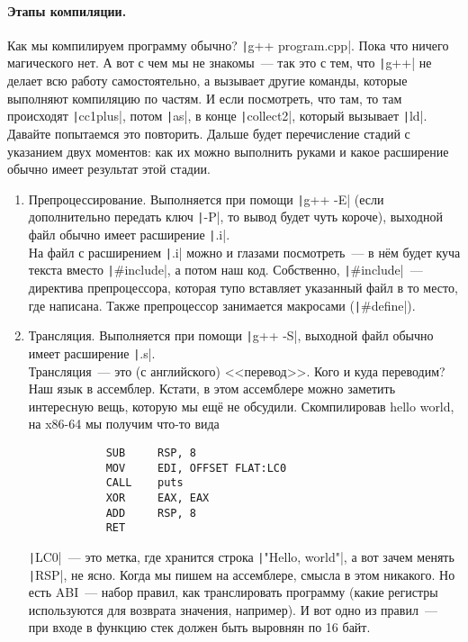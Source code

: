 \documentclass{article}
\begin{document}
    \paragraph{Этапы компиляции.}
    Как мы компилируем программу обычно? \texttt|g++ program.cpp|. Пока что ничего магического нет. А вот с чем мы не знакомы~--- так это с тем, что \texttt|g++| не делает всю работу самостоятельно, а вызывает другие команды, которые выполняют компиляцию по частям. И если посмотреть, что там, то там происходят \texttt|cc1plus|, потом \texttt|as|, в конце \texttt|collect2|, который вызывает \texttt|ld|. Давайте попытаемся это повторить. Дальше будет перечисление стадий с указанием двух моментов: как их можно выполнить руками и какое расширение обычно имеет результат этой стадии.
    \begin{enumerate}
        \item Препроцессирование. Выполняется при помощи \texttt|g++ -E| (если дополнительно передать ключ \texttt|-P|, то вывод будет чуть короче), выходной файл обычно имеет расширение \texttt|.i|.\\
        На файл с расширением \texttt|.i| можно и глазами посмотреть~--- в нём будет куча текста вместо \texttt|#include|, а потом наш код. Собственно, \texttt|#include|~--- директива препроцессора, которая тупо вставляет указанный файл в то место, где написана. Также препроцессор занимается макросами (\texttt|#define|).
        \item Трансляция. Выполняется при помощи \texttt|g++ -S|, выходной файл обычно имеет расширение \texttt|.s|.\\
        Трансляция~--- это (с английского) <<перевод>>. Кого и куда переводим? Наш язык в ассемблер. Кстати, в этом ассемблере можно заметить интересную вещь, которую мы ещё не обсудили. Скомпилировав hello world, на x86-64 мы получим что-то вида
        \begin{verbatim}
            SUB     RSP, 8
            MOV     EDI, OFFSET FLAT:LC0
            CALL    puts
            XOR     EAX, EAX
            ADD     RSP, 8
            RET
        \end{verbatim}
        \texttt|LC0|~--- это метка, где хранится строка \texttt|"Hello, world"|, а вот зачем менять \texttt|RSP|, не ясно. Когда мы пишем на ассемблере, смысла в этом никакого. Но есть ABI~--- набор правил, как транслировать программу (какие регистры используются для возврата значения, например). И вот одно из правил~--- при входе в функцию стек должен быть выровнян по 16 байт.

\end{enumerate}
\end{document}

